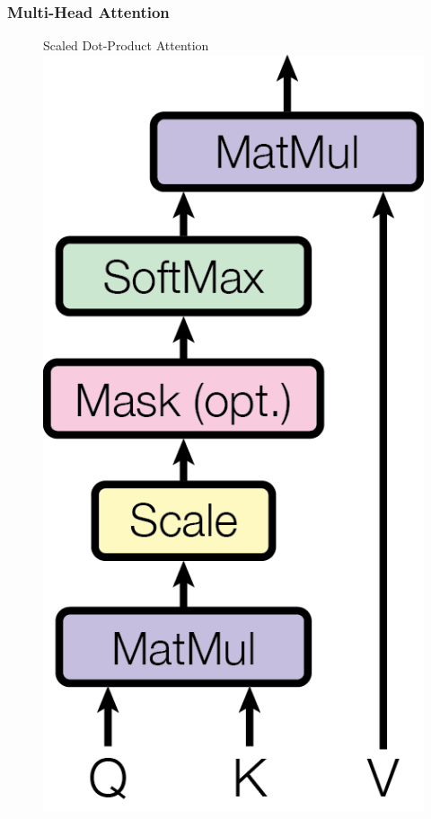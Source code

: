 \subsubsection{Multi-Head Attention} \label{sec:multihead}

\begin{figure}
  \begin{minipage}[t]{0.5\textwidth}
    \centering
    Scaled Dot-Product Attention \\
    \vspace{0.5cm}
    \includegraphics[scale=0.6]{Figures/ModalNet-19}

\end{minipage}
\end{figure}
